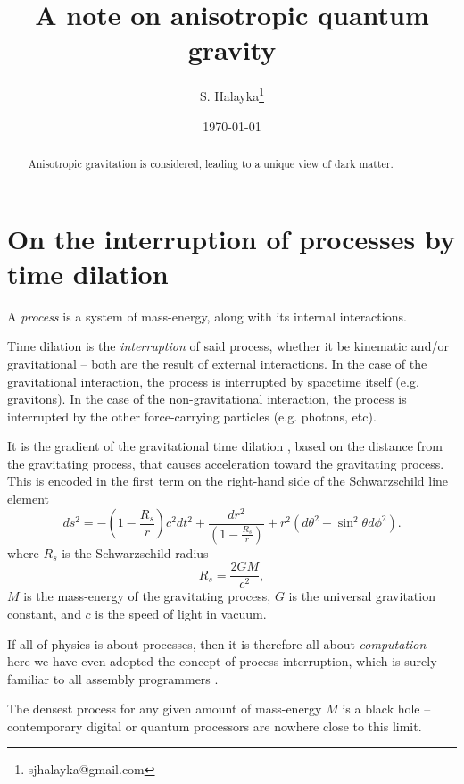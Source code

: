 \documentclass[12pt]{article}
\title{A note on anisotropic quantum gravity}
\author{S. Halayka\footnote{sjhalayka@gmail.com}}
\date{\today}
\begin{document}
 
\maketitle

\begin{abstract}
Anisotropic gravitation is considered, leading to a unique view of dark matter.
\end{abstract}






\section{On the interruption of processes by time dilation}

A {\textit{process}} is a system of mass-energy, along with its internal interactions.

Time dilation is the {\textit{interruption}} of said process, whether it be kinematic and/or gravitational -- both are the result of external interactions.
In the case of the gravitational interaction, the process is interrupted by spacetime itself (e.g. gravitons).
In the case of the non-gravitational interaction, the process is interrupted by the other force-carrying particles (e.g. photons, etc).

It is the gradient of the gravitational time dilation \cite{misner}, based on the distance from the gravitating process, that causes acceleration toward the gravitating process.
This is encoded in the first term on the right-hand side of the Schwarzschild line element
\begin{equation}
ds^2 = -\left( 1 - \frac{R_s}{r} \right) c^2 dt^2 + \frac{dr^2}{\left( 1 - \frac{R_s}{r} \right)} + r^2 (d\theta^2 + \sin^2 \theta d\phi^2).
\end{equation}
where $R_s$ is the Schwarzschild radius
\begin{equation}
R_s = \frac{2GM}{c^2},
\end{equation}
$M$ is the mass-energy of the gravitating process, $G$ is the universal gravitation constant, and $c$ is the speed of light in vacuum.

If all of physics is about processes, then it is therefore all about {\textit{computation}} \cite{zuse, wolfram} -- here we have even adopted the concept of process interruption, which is surely familiar to all assembly programmers \cite{abrash}.

The densest process for any given amount of mass-energy $M$ is a black hole -- contemporary digital or quantum processors are nowhere close to this limit.
\end{document}

